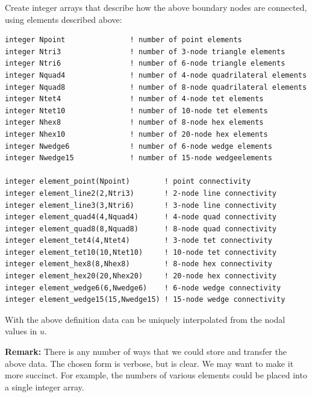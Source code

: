 \documentclass[11pt]{article}
\begin{document}
Create integer arrays that describe how the above boundary nodes are
connected, using elements described above:
\begin{verbatim}
integer Npoint               ! number of point elements
integer Ntri3                ! number of 3-node triangle elements
integer Ntri6                ! number of 6-node triangle elements
integer Nquad4               ! number of 4-node quadrilateral elements
integer Nquad8               ! number of 8-node quadrilateral elements
integer Ntet4                ! number of 4-node tet elements
integer Ntet10               ! number of 10-node tet elements
integer Nhex8                ! number of 8-node hex elements
integer Nhex10               ! number of 20-node hex elements
integer Nwedge6              ! number of 6-node wedge elements
integer Nwedge15             ! number of 15-node wedgeelements

integer element_point(Npoint)        ! point connectivity
integer element_line2(2,Ntri3)       ! 2-node line connectivity
integer element_line3(3,Ntri6)       ! 3-node line connectivity
integer element_quad4(4,Nquad4)      ! 4-node quad connectivity
integer element_quad8(8,Nquad8)      ! 8-node quad connectivity
integer element_tet4(4,Ntet4)        ! 3-node tet connectivity
integer element_tet10(10,Ntet10)     ! 10-node tet connectivity
integer element_hex8(8,Nhex8)        ! 8-node hex connectivity
integer element_hex20(20,Nhex20)     ! 20-node hex connectivity
integer element_wedge6(6,Nwedge6)    ! 6-node wedge connectivity
integer element_wedge15(15,Nwedge15) ! 15-node wedge connectivity

\end{verbatim}

With the above definition data can be uniquely interpolated from the nodal
values in $u$.

\textbf{Remark:} There is any number of ways that we could store and
transfer the above data.  The chosen form is verbose, but is clear.  We may
want to make it more succinct.  For example, the numbers of various elements
could be placed into a single integer array.  
\end{document}
